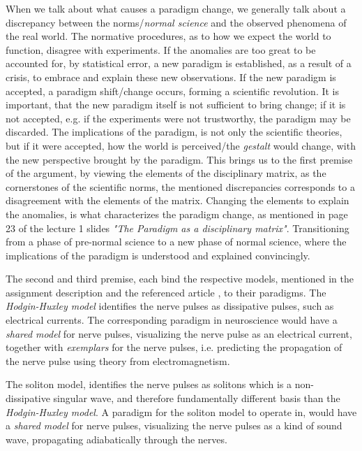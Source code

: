 When we talk about what causes a paradigm change, we generally talk about a discrepancy between the norms/\textit{normal science} and the observed phenomena of the real world. The normative procedures, as to how we expect the world to function, disagree with experiments. If the anomalies are too great to be accounted for, by statistical error, a new paradigm is established, as a result of a crisis, to embrace and explain these new observations. If the new paradigm is accepted, a paradigm shift/change occurs, forming a scientific revolution. It is important, that the new paradigm itself is not sufficient to bring change; if it is not accepted, e.g. if the experiments were not trustworthy, the paradigm may be discarded. The implications of the paradigm, is not only the scientific theories, but if it were accepted, how the world is perceived/the \textit{gestalt} would change, with the new perspective brought by the paradigm. This brings us to the first premise of the argument, by viewing the elements of the disciplinary matrix, as the cornerstones of the scientific norms, the mentioned discrepancies corresponds to a disagreement with the elements of the matrix. Changing the elements to explain the anomalies, is what characterizes the paradigm change, as mentioned in page 23 of the lecture 1 slides \textit{"The Paradigm as a disciplinary matrix"}. Transitioning from a phase of pre-normal science to a new phase of normal science, where the implications of the paradigm is understood and explained convincingly.

The second and third premise, each bind the respective models, mentioned in the assignment description and the referenced article \cite{SolitonSite}, to their paradigms. The \textit{Hodgin-Huxley model} identifies the nerve pulses as dissipative pulses, such as electrical currents. The corresponding paradigm in neuroscience would have a \textit{shared model} for nerve pulses, visualizing the nerve pulse as an electrical current, together with \textit{exemplars} for the nerve pulses, i.e. predicting the propagation of the nerve pulse using theory from electromagnetism. 

The soliton model, identifies the nerve pulses as solitons which is a non-dissipative singular wave, and therefore fundamentally different basis than the \textit{Hodgin-Huxley model}. A paradigm for the soliton model to operate in, would have a \textit{shared model} for nerve pulses, visualizing the nerve pulses as a kind of sound wave, propagating adiabatically through the nerves.


